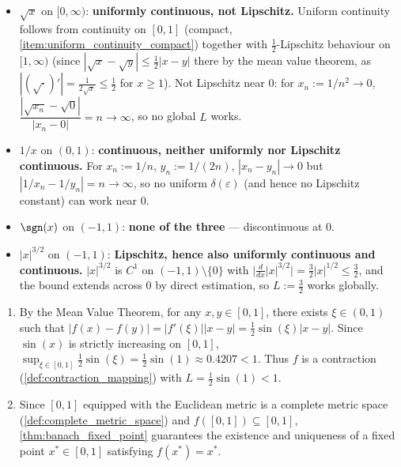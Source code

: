 \begin{exercisesolution}
\begin{itemize}
  \item $\sqrt{x}$ on $[0,\infty)$: \textbf{uniformly continuous, not Lipschitz.} Uniform
    continuity follows from continuity on $[0,1]$ (compact, \cref{item:uniform_continuity_compact})
    together with $\tfrac12$-Lipschitz behaviour on $[1,\infty)$ (since $|\sqrt x - \sqrt y| \leq
    \tfrac12|x-y|$ there by the mean value theorem, as $|(\sqrt{\cdot})'| = \tfrac{1}{2\sqrt x}
    \leq \tfrac12$ for $x \geq 1$). Not Lipschitz near $0$: for $x_n :=
    1/n^2 \to 0$, $\dfrac{|\sqrt{x_n}-\sqrt0|}{|x_n-0|} = n \to \infty$, so no global $L$ works.
  \item $1/x$ on $(0,1)$: \textbf{continuous, neither uniformly nor Lipschitz continuous.} For
    $x_n := 1/n$, $y_n := 1/(2n)$, $|x_n-y_n| \to 0$ but $|1/x_n - 1/y_n| = n \to \infty$, so no
    uniform $\delta(\varepsilon)$ (and hence no Lipschitz constant) can work near $0$.
  \item $\sgn(x)$ on $(-1,1)$: \textbf{none of the three} --- discontinuous at $0$.
  \item $|x|^{3/2}$ on $(-1,1)$: \textbf{Lipschitz, hence also uniformly continuous and
    continuous.} $|x|^{3/2}$ is $C^1$ on $(-1,1)\setminus\{0\}$ with $\big|\tfrac{d}{dx}|x|^{3/2}\big|
    = \tfrac32|x|^{1/2} \leq \tfrac32$, and the bound extends across $0$ by direct estimation, so
    $L := \tfrac32$ works globally.
\end{itemize}
\end{exercisesolution}

\begin{exercisesolution}
\begin{enumerate}[label=\textbf{(\alph*)}]
  \item By the Mean Value Theorem, for any $x, y \in [0,1]$, there exists $\xi \in (0,1)$ such that $|f(x) - f(y)| = |f'(\xi)| |x-y| = \frac{1}{2}\sin(\xi) |x-y|$. Since $\sin(x)$ is strictly increasing on $[0,1]$, $\sup_{\xi \in [0,1]} \frac{1}{2}\sin(\xi) = \frac{1}{2}\sin(1) \approx 0.4207 < 1$. Thus $f$ is a contraction (\cref{def:contraction_mapping}) with $L = \frac{1}{2}\sin(1) < 1$.
  \item Since $[0,1]$ equipped with the Euclidean metric is a complete metric space (\cref{def:complete_metric_space}) and $f([0,1]) \subseteq [0,1]$, \cref{thm:banach_fixed_point} guarantees the existence and uniqueness of a fixed point $x^* \in [0,1]$ satisfying $f(x^*) = x^*$.
\end{enumerate}
\end{exercisesolution}

